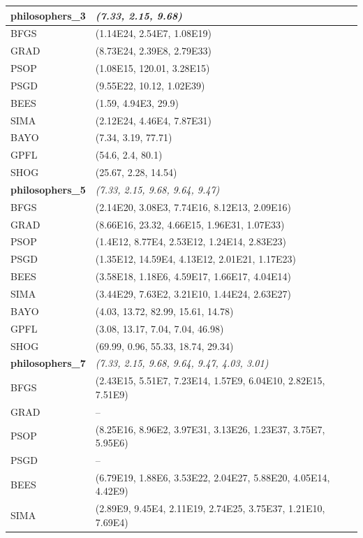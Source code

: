 \begin{table}
	\fontsize{8}{9.5}\selectfont
	\center
	\begin{tabular}{ll}
		\hline
		\textbf{philosophers\_3} &\textit{(7.33, 2.15, 9.68)}\\
		\hline
		BFGS & (1.14E24, 2.54E7, 1.08E19)\\
		GRAD & (8.73E24, 2.39E8, 2.79E33)\\
		PSOP & (1.08E15, 120.01, 3.28E15)\\
		PSGD & (9.55E22, 10.12, 1.02E39)\\
		BEES & (1.59, 4.94E3, 29.9)\\
		SIMA & (2.12E24, 4.46E4, 7.87E31)\\
		BAYO & (7.34, 3.19, 77.71)\\
		GPFL & (54.6, 2.4, 80.1)\\
		SHOG & (25.67, 2.28, 14.54)\\
		\hline
		\textbf{philosophers\_5} & \textit{(7.33, 2.15, 9.68, 9.64, 9.47)}\\
		\hline
		BFGS & (2.14E20, 3.08E3, 7.74E16, 8.12E13, 2.09E16)\\
		GRAD & (8.66E16, 23.32, 4.66E15, 1.96E31, 1.07E33)\\
		PSOP & (1.4E12, 8.77E4, 2.53E12, 1.24E14, 2.83E23)\\
		PSGD & (1.35E12, 14.59E4, 4.13E12, 2.01E21, 1.17E23)\\
		BEES & (3.58E18, 1.18E6, 4.59E17, 1.66E17, 4.04E14)\\
		SIMA & (3.44E29, 7.63E2, 3.21E10, 1.44E24, 2.63E27)\\
		BAYO & (4.03, 13.72, 82.99, 15.61, 14.78)\\
		GPFL & (3.08, 13.17, 7.04, 7.04, 46.98)\\
		SHOG & (69.99, 0.96, 55.33, 18.74, 29.34)\\
		\hline
		\textbf{philosophers\_7} & \textit{(7.33, 2.15, 9.68, 9.64, 9.47, 4.03, 3.01)}\\
		\hline
		BFGS & (2.43E15, 5.51E7, 7.23E14, 1.57E9, 6.04E10, 2.82E15, 7.51E9)\\
		GRAD & --\\
		PSOP & (8.25E16, 8.96E2, 3.97E31, 3.13E26, 1.23E37, 3.75E7, 5.95E6)\\
		PSGD & --\\
		BEES & (6.79E19, 1.88E6, 3.53E22, 2.04E27, 5.88E20, 4.05E14, 4.42E9)\\
		SIMA & (2.89E9, 9.45E4, 2.11E19, 2.74E25, 3.75E37, 1.21E10, 7.69E4)\\

\end{tabular}
\end{table}

